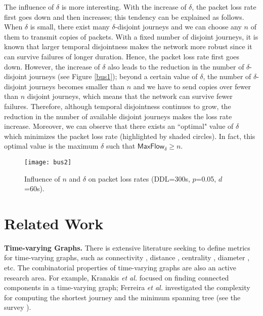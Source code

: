 \documentclass[10pt, conference, letterpaper]{IEEEtran}
\begin{document}
The influence of $\delta$ is more interesting. With the increase of $\delta$, the packet loss rate first goes down and then increases; this tendency can be explained as follows. When $\delta$ is small, there exist many  $\delta$-disjoint journeys and we can choose any $n$ of them to transmit copies of packets. With a fixed number of disjoint journeys, it is known that larger temporal disjointness makes the network more robust since it can survive failures of longer duration. Hence, the packet loss rate first goes down. However, the increase of $\delta$ also leads to the reduction in the number of $\delta$-disjoint journeys (see Figure \ref{bus1}); beyond a certain value of $\delta$, the number of $\delta$-disjoint journeys becomes smaller than $n$ and we have to send copies over fewer than $n$ disjoint journeys, which means that the network can survive fewer failures. Therefore, although temporal disjointness continues to grow, the reduction in the  number of available disjoint journeys makes the loss rate increase. Moreover, we can observe that there exists an ``optimal" value of $\delta$ which minimizes the packet loss rate (highlighted by shaded circles). In fact, this optimal value is the maximum $\delta$ such that $\mathsf{MaxFlow}_{\delta} \ge n$.

\begin{figure}[t]
\begin{center}
\texttt{[image: bus2]}
\caption{Influence of $n$ and $\delta$ on packet loss rates (DDL=300s, $p$=0.05, $d$=60s).}
\label{bus2}\vspace{-3mm}
\end{center}
\end{figure}










\section{Related Work}\label{related_works}
\noindent \textbf{Time-varying Graphs.}
There is extensive literature seeking to define metrics for time-varying graphs, such as connectivity \cite{TVG1, con, TVG11}, distance \cite{TVG3}, centrality \cite{TVG6, TVG7}, diameter \cite{TVG8,TVG9}, etc. The combinatorial properties of time-varying graphs are also an active research area. For example, Kranakis \emph{et al.} focused on finding connected components in a time-varying graph; Ferreira \emph{et al.} investigated the complexity for computing the shortest journey \cite{TVG3} and the minimum spanning tree \cite{TVG11} (see the survey \cite{TVG2}).
\end{document}

